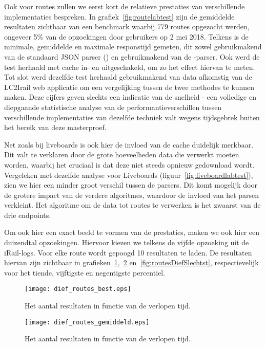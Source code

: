 Ook voor routes zullen we eerst kort de relatieve prestaties van verschillende implementaties bespreken. In grafiek~\ref{fig:routelabtest} zijn de gemiddelde resultaten zichtbaar van een benchmark waarbij 779 routes opgezocht werden, ongeveer 5\% van de opzoekingen door gebruikers op 2 mei 2018. Telkens is de minimale, gemiddelde en maximale responstijd gemeten, dit zowel gebruikmakend van de standaard JSON parser () en gebruikmakend van de -parser. Ook werd de test herhaald met cache in- en uitgeschakeld, om zo het effect hiervan te meten. Tot slot werd dezelfde test herhaald gebruikmakend van data afkomstig van de LC2Irail web applicatie om een vergelijking tussen de twee methodes te kunnen maken. Deze cijfers geven slechts een indicatie van de snelheid - een volledige en diepgaande statistische analyse van de performantieverschillen tussen verschillende implementaties van dezelfde techniek valt wegens tijdsgebrek buiten het bereik van deze masterproef.

Net zoals bij liveboards is ook hier de invloed van de cache duidelijk merkbaar. Dit valt te verklaren door de grote hoeveelheden data die verwerkt moeten worden, waarbij het cruciaal is dat deze niet steeds opnieuw gedownload wordt. Vergeleken met dezelfde analyse voor Liveboards (figuur~\ref{fig:liveboardlabtest}), zien we hier een minder groot verschil tussen de parsers. Dit komt mogelijk door de grotere impact van de verdere algoritmes, waardoor de invloed van het parsen verkleint. Het algoritme om de data tot routes te verwerken is het zwaarst van de drie endpoints. %

Om ook hier een exact beeld te vormen van de prestaties, maken we ook hier een duizendtal opzoekingen. Hiervoor kiezen we telkens de vijfde opzoeking uit de iRail-logs. Voor elke route wordt gepoogd 10 resultaten te laden. De resultaten hiervan zijn zichtbaar in grafieken~\ref{fig:routesDiefBest},~\ref{fig:routesDiefAvg} en~\ref{fig:routesDiefSlechtst}, respectievelijk voor het tiende, vijftigste en negentigste percentiel.

\begin{figure}[h]
	\centering
	\texttt{[image: dief\_routes\_best.eps]}
	\caption[Aantal resultaten routes in functie van de tijd (10e percentiel)]{Het aantal resultaten in functie van de verlopen tijd.}
	\label{fig:routesDiefBest}
\end{figure}

\begin{figure}[h]
	\centering
	\texttt{[image: dief\_routes\_gemiddeld.eps]}
	\caption[Aantal resultaten routes in functie van de tijd (mediaan)]{Het aantal resultaten in functie van de verlopen tijd.}
	\label{fig:routesDiefAvg}
\end{figure}

